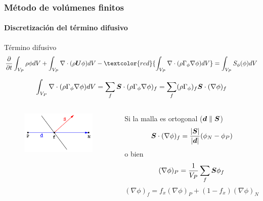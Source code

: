 \begin{frame}
    \frametitle{M\'etodo de vol\'umenes finitos}
    \framesubtitle{Discretizaci\'on del t\'ermino difusivo}
    
    \vspace*{-0.1cm}
    \begin{block}{T\'ermino difusivo}
        \footnotesize
        \begin{equation*}
            \frac{\partial}{\partial t} \int_{V_{P}}\rho \phi dV + 
            \int_{V_{P}}\nabla \cdot (\rho \bs{U} \phi) dV - 
            \textcolor{red}{ \int_{V_{P}}\nabla \cdot (\rho \Gamma_{\phi} \nabla \phi) dV } =  
            \int_{V_{P}}S_{\phi}(\phi) dV 
        \end{equation*}
    \end{block}     
    

    \footnotesize
    $$ \int_{V_{P}}\nabla \cdot (\rho \Gamma_{\phi} \nabla \phi) dV = \displaystyle \sum_f \boldsymbol{S} \cdot (\rho \Gamma_{\phi} \nabla \phi)_f = \displaystyle \sum_f (\rho \Gamma_{\phi})_f \boldsymbol{S} \cdot (\nabla \phi)_f $$

    
    \begin{columns}
            
        \vspace*{-0.8cm}
        \begin{figure}[h]
            \begin{center}
                \includegraphics[width=0.98\textwidth]{Imagenes/face_S_d}
            \end{center}
        \end{figure}     
                                               
        \begin{block}{}
          \footnotesize
          \centering Si la malla es ortogonal ($\boldsymbol{d} \parallel \boldsymbol{S}$)
          $$  \boldsymbol{S} \cdot (\nabla \phi)_f = \frac{|\boldsymbol{S}|}{|\boldsymbol{d}|} (\phi_N - \phi_P)  $$
          o bien
          $$  (\nabla \phi)_P = \frac{1}{V_P} \sum_f \boldsymbol{S} \phi_f  $$
          $$  (\nabla \phi)_f = f_x (\nabla \phi)_P + (1-f_x)(\nabla \phi)_N  $$
        \end{block}
    \end{columns}

\end{frame}       





